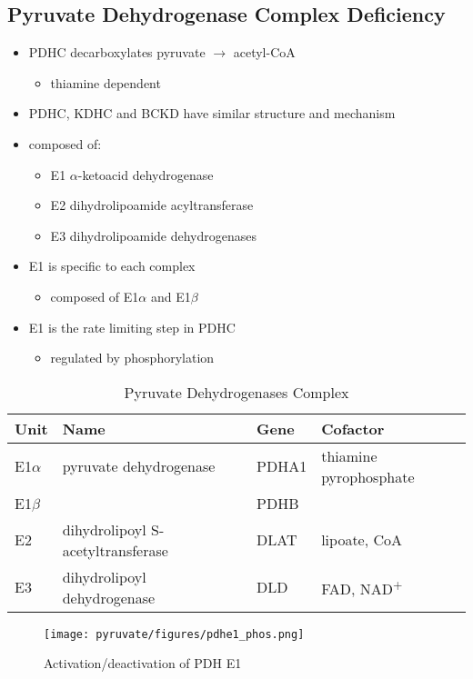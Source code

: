 \documentclass[12pt]{scrartcl}
\begin{document}
\subsection{Pyruvate Dehydrogenase Complex Deficiency}
\label{sec:orgcf9d3d7}
\begin{itemize}
\item PDHC decarboxylates pyruvate \(\to\) acetyl-CoA
\begin{itemize}
\item thiamine dependent
\end{itemize}
\item PDHC, KDHC and BCKD have similar structure and mechanism
\item composed of:
\begin{itemize}
\item E1 \(\alpha\)-ketoacid dehydrogenase
\item E2 dihydrolipoamide acyltransferase
\item E3 dihydrolipoamide dehydrogenases
\end{itemize}
\item E1 is specific to each complex
\begin{itemize}
\item composed of E1\(\alpha\) and E1\(\beta\)
\end{itemize}
\item E1 is the rate limiting step in PDHC
\begin{itemize}
\item regulated by phosphorylation
\end{itemize}
\end{itemize}

\begin{table}[htbp]
\caption{\label{tab:orgb13f0c9}Pyruvate Dehydrogenases Complex}
\centering
\begin{tabular}{llll}
Unit & Name & Gene & Cofactor\\
\hline
E1\(\alpha\) & pyruvate dehydrogenase & PDHA1 & thiamine pyrophosphate\\
E1\(\beta\) &  & PDHB & \\
E2 & dihydrolipoyl  S-acetyltransferase & DLAT & lipoate, CoA\\
E3 & dihydrolipoyl dehydrogenase & DLD & FAD, NAD\textsuperscript{+}\\
\end{tabular}
\end{table}

\begin{figure}[htbp]
\centering
\texttt{[image: pyruvate/figures/pdhe1\_phos.png]}
\caption[pdhe1]{\label{fig:org19509df}Activation/deactivation of PDH E1}
\end{figure}
\end{document}
